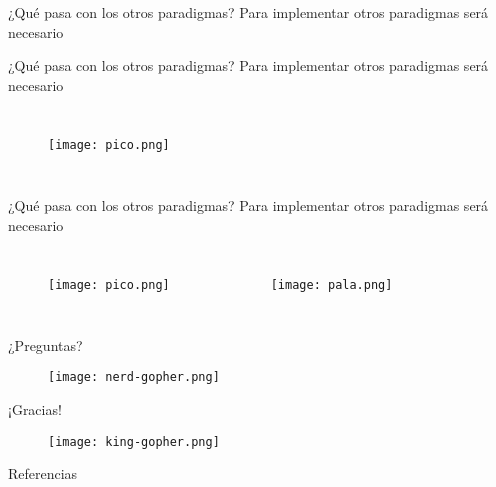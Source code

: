 \begin{frame}{¿Qué pasa con los otros paradigmas?}
    Para implementar otros paradigmas será necesario
    
\end{frame}

\begin{frame}{¿Qué pasa con los otros paradigmas?}
    Para implementar otros paradigmas será necesario
    \begin{columns}
        \begin{figure}[H]
            \centering
            \texttt{[image: pico.png]}
        \end{figure}
    \end{columns}
\end{frame}

\begin{frame}{¿Qué pasa con los otros paradigmas?}
    Para implementar otros paradigmas será necesario
    \begin{columns}
        \begin{figure}[H]
            \centering
            \texttt{[image: pico.png]}
        \end{figure}
        \begin{figure}[H]
            \centering
            \texttt{[image: pala.png]}
        \end{figure}
    \end{columns}
    
\end{frame}

\begin{frame}{¿Preguntas?}
    \begin{figure}[H]
        \centering
        \texttt{[image: nerd-gopher.png]}
    \end{figure}
\end{frame}

\begin{frame}{¡Gracias!}
    \begin{figure}[H]
        \centering
        \texttt{[image: king-gopher.png]}
        \caption{}
        \label{fig:}
    \end{figure}
\end{frame}

\begin{frame}{Referencias}
    \printbibliography
\end{frame}


